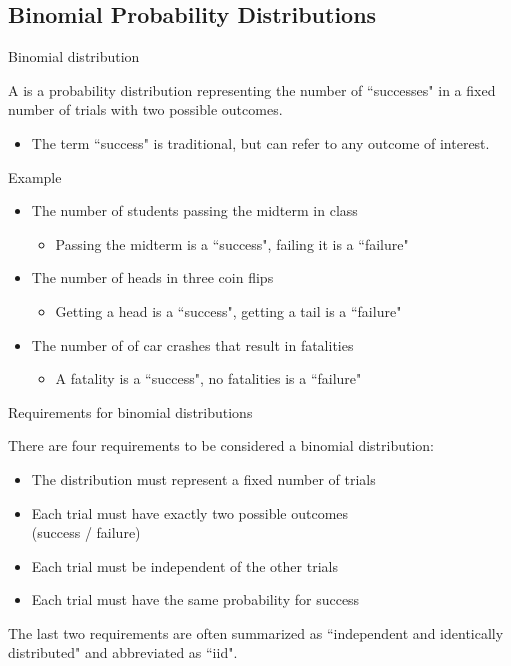 \documentclass[xcolor=table, handout]{beamer}
\begin{document}
\subsection{Binomial Probability Distributions}

\begin{frame}{Binomial distribution}
\begin{block}{}
{\large A  is a probability distribution representing the number of ``successes" in a fixed number of trials with two possible outcomes. }
\begin{itemize}
\pause\item The term ``success" is traditional, but can refer to any outcome of interest.
\end{itemize}
\end{block}
\pause
\begin{exampleblock}{Example}
\begin{itemize}
\item The number of students passing the midterm in class
\begin{itemize}
\item Passing the midterm is a ``success", failing it is a ``failure"
\end{itemize}
\pause\item The number of heads in three coin flips
\begin{itemize}
\item Getting a head is a ``success", getting a tail is a ``failure"
\end{itemize}
\pause\item The number of of car crashes that result in fatalities
\begin{itemize}
\item A fatality is a ``success", no fatalities is a ``failure"
\end{itemize}

\end{itemize}
\end{exampleblock}
\end{frame}

\begin{frame}{Requirements for binomial distributions}
\begin{block}{}
There are four requirements to be considered a binomial distribution:
\begin{itemize}
\pause\item The distribution must represent a fixed number of trials
\pause\item Each trial must have exactly two possible outcomes\\(success / failure)
\pause\item Each trial must be independent of the other trials
\pause\item Each trial must have the same probability for success
\end{itemize}
\pause The last two requirements are often summarized as ``independent and identically distributed" and abbreviated as ``iid".
\end{block}
\end{frame}
\end{document}
